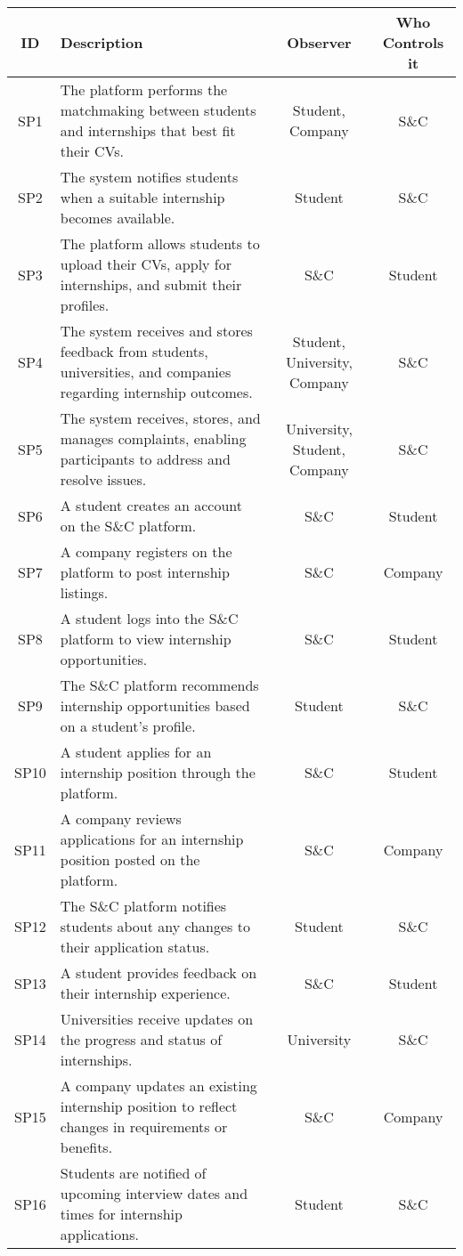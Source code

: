 \begin{longtable}{|c|p{5cm}|c|c|}
\hline
\textbf{ID} & \textbf{Description} & \textbf{Observer} & \textbf{Who Controls it} \\ \hline
SP1 & The platform performs the matchmaking between students and internships that best fit their CVs. & Student, Company & S\&C \\ \hline
SP2 & The system notifies students when a suitable internship becomes available. & Student & S\&C \\ \hline
SP3 & The platform allows students to upload their CVs, apply for internships, and submit their profiles. & S\&C & Student \\ \hline
SP4 & The system receives and stores feedback from students, universities, and companies regarding internship outcomes.& Student, University, Company & S\&C \\ \hline
SP5 & The system receives, stores, and manages complaints, enabling participants to address and resolve issues. & University, Student, Company & S\&C \\ \hline
SP6 & A student creates an account on the S\&C platform. & S\&C & Student \\ \hline
SP7 & A company registers on the platform to post internship listings.& S\&C & Company \\ \hline
SP8 & A student logs into the S\&C platform to view internship opportunities. & S\&C & Student \\ \hline
SP9 & The S\&C platform recommends internship opportunities based on a student's profile. & Student & S\&C \\ \hline
SP10 & A student applies for an internship position through the platform. & S\&C & Student \\ \hline
SP11 & A company reviews applications for an internship position posted on the platform. & S\&C & Company \\ \hline
SP12 & The S\&C platform notifies students about any changes to their application status. & Student & S\&C \\ \hline
SP13 & A student provides feedback on their internship experience. & S\&C & Student \\ \hline
SP14 & Universities receive updates on the progress and status of internships. & University & S\&C \\ \hline
SP15 & A company updates an existing internship position to reflect changes in requirements or benefits. & S\&C & Company \\ \hline
SP16 & Students are notified of upcoming interview dates and times for internship applications. & Student & S\&C \\ \hline

\end{longtable}
